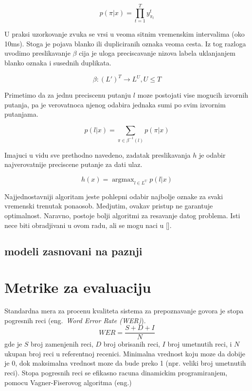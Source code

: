\documentclass[a4paper]{article}
\DeclareMathOperator*{\argmax}{argmax}
\begin{document}
$$p(\pi|x) = \prod_{t=1}^Ty_{\pi_t}^t$$

U praksi uzorkovanje zvuka se vrsi u veoma sitnim vremenskim intervalima (oko 10ms). Stoga je pojava blanko ili dupliciranih oznaka veoma cesta.  Iz tog razloga uvodimo preslikavanje $\beta$ cija je uloga preciscavanje nizova labela uklanjanjem blanko oznaka i susednih duplikata.  

$$\beta : (L')^T \rightarrow L^U,  U \leq T$$

Primetimo da za jednu preciscenu putanju $l$ moze postojati vise mogucih izvornih putanja,  pa je verovatnoca njenog odabira jednaka sumi po svim izvornim putanjama.

\begin{equation}
\label{eq:beta}
p(l | x) = \sum_{\pi \in \beta^{-1}(l)} p(\pi | x)
\end{equation}

Imajuci u vidu sve prethodno navedeno,  zadatak preslikavanja $h$ je odabir najverovatnije preciscene putanje za dati ulaz.

\begin{equation}
\label{eq:h_x}
h(x) = \argmax_{l \in L^U} p(l | x)
\end{equation}

Najjednostavniji algoritam jeste pohlepni odabir najbolje oznake za svaki vremenski trenutak ponaosob.  Medjutim, ovakav pristup ne garantuje optimalnost.  Naravno,  postoje bolji algoritmi za resavanje datog problema. Isti nece biti obradjivani u ovom radu, ali se mogu naci u [].

\subsection{modeli zasnovani na paznji}

\section{Metrike za evaluaciju}
Standardna mera za procenu kvaliteta sistema za prepoznavanje govora je stopa pogresnih reci (eng.~{\em Word Error Rate (WER)}).
\begin{equation*}
  WER = \frac{S + D + I}{N}
\end{equation*}
gde je $S$ broj zamenjenih reci, $D$ broj obrisanih reci, $I$ broj umetnutih reci, i $N$ ukupan broj reci u referentnoj recenici.
Minimalna vrednost koju moze da dobije je 0, dok maksimalna vrednost moze da bude preko 1 (npr. veliki broj umetnutih reci).
Stopa pogresnih reci se efikasno racuna dinamickim programiranjem, pomocu Vagner-Fiserovog algoritma (eng.)
\end{document}
